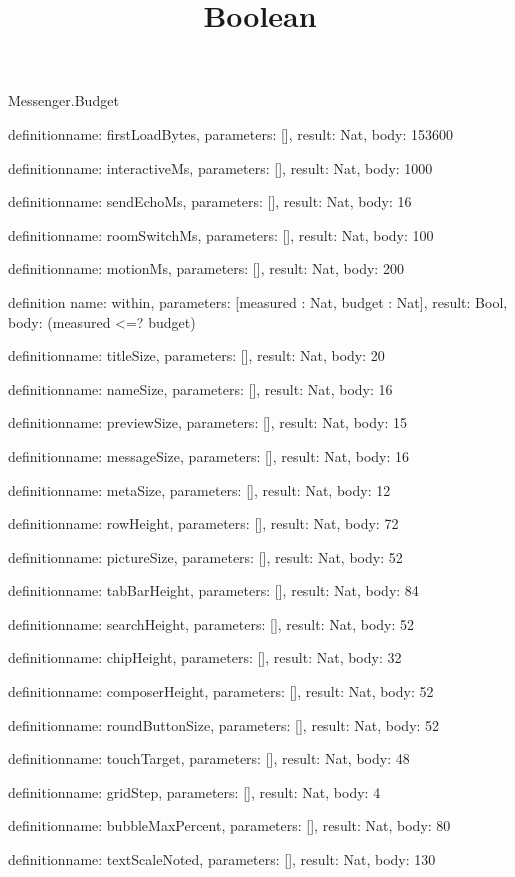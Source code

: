 \begin{lexlean}{Messenger.Budget}
\title{Boolean}
\begin{semanticmodule}
definition{name: firstLoadBytes, parameters: [], result: Nat, body: 153600}

definition{name: interactiveMs, parameters: [], result: Nat, body: 1000}

definition{name: sendEchoMs, parameters: [], result: Nat, body: 16}

definition{name: roomSwitchMs, parameters: [], result: Nat, body: 100}

definition{name: motionMs, parameters: [], result: Nat, body: 200}

definition{
  name: within,
  parameters: [measured : Nat, budget : Nat],
  result: Bool,
  body: (measured <=? budget)
}

definition{name: titleSize, parameters: [], result: Nat, body: 20}

definition{name: nameSize, parameters: [], result: Nat, body: 16}

definition{name: previewSize, parameters: [], result: Nat, body: 15}

definition{name: messageSize, parameters: [], result: Nat, body: 16}

definition{name: metaSize, parameters: [], result: Nat, body: 12}

definition{name: rowHeight, parameters: [], result: Nat, body: 72}

definition{name: pictureSize, parameters: [], result: Nat, body: 52}

definition{name: tabBarHeight, parameters: [], result: Nat, body: 84}

definition{name: searchHeight, parameters: [], result: Nat, body: 52}

definition{name: chipHeight, parameters: [], result: Nat, body: 32}

definition{name: composerHeight, parameters: [], result: Nat, body: 52}

definition{name: roundButtonSize, parameters: [], result: Nat, body: 52}

definition{name: touchTarget, parameters: [], result: Nat, body: 48}

definition{name: gridStep, parameters: [], result: Nat, body: 4}

definition{name: bubbleMaxPercent, parameters: [], result: Nat, body: 80}

definition{name: textScaleNoted, parameters: [], result: Nat, body: 130}


\end{semanticmodule}
\end{lexlean}
